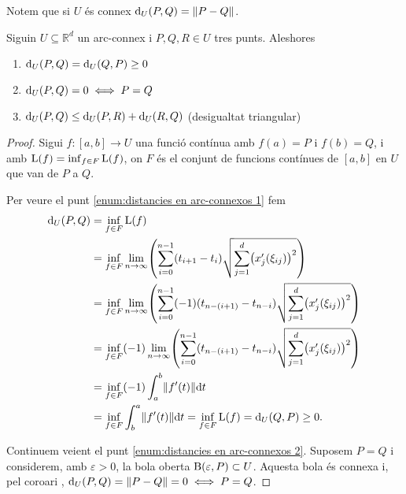 \documentclass[../Apunts.tex]{subfiles}
\begin{document}
	\begin{observation}\label{obs:connex metrica}
		Notem que si \(U\) és connex \(\Dist_{U}(P,Q)=\norm{P-Q}\).
	\end{observation}
	\begin{proposition}
		Siguin \(U\subseteq\mathbb{R}^{d}\) un arc-connex i \(P,Q,R\in U\) tres punts. Aleshores
		\begin{enumerate}
			\item\label{enum:distancies en arc-connexos 1} \(\operatorname{d}_{U}(P,Q)=\operatorname{d}_{U}(Q,P)\geq0\)
			\item\label{enum:distancies en arc-connexos 2} \(\operatorname{d}_{U}(P,Q)=0\iff P=Q\)
			\item\label{enum:distancies en arc-connexos 3} \(\operatorname{d}_{U}(P,Q)\leq \operatorname{d}_{U}(P,R)+\operatorname{d}_{U}(R,Q)\) (desigualtat triangular) %
		\end{enumerate}
		\begin{proof}
			Sigui \(f\colon[a,b]\to U\) una funció contínua amb \(f(a)=P\) i \(f(b)=Q\), i  amb \(\operatorname{L}(f)=\inf_{f\in F}\operatorname{L}(f)\), on \(F\) és el conjunt de funcions contínues de \([a,b]\) en \(U\) que van de \(P\) a \(Q\). %
			
			Per veure el punt \eqref{enum:distancies en arc-connexos 1} fem
			\begin{align*}
			\Dist_{U}(P,Q)&=\inf_{f\in F}\Long(f)\\
			&=\inf_{f\in F}\lim_{n\to\infty}\left(\sum_{i=0}^{n-1}(t_{i+1}-t_{i})\sqrt{\sum_{j=1}^{d}\left(x_{j}'(\xi_{ij})\right)^2}\right)\\
			&=\inf_{f\in F}\lim_{n\to\infty}\left(\sum_{i=0}^{n-1}(-1)(t_{n-(i+1)}-t_{n-i})\sqrt{\sum_{j=1}^{d}\left(x_{j}'(\xi_{ij})\right)^2}\right)\\
			&=\inf_{f\in F}(-1)\lim_{n\to\infty}\left(\sum_{i=0}^{n-1}(t_{n-(i+1)}-t_{n-i})\sqrt{\sum_{j=1}^{d}\left(x_{j}'(\xi_{ij})\right)^2}\right)\\
			&=\inf_{f\in F}(-1)\int_{a}^{b}\norm{f'(t)}\diff t\\
			&=\inf_{f\in F}\int_{b}^{a}\norm{f'(t)}\diff t=\inf_{f\in F}\Long(f)=\Dist_{U}(Q,P)\geq0.
			\end{align*}
			
			Continuem veient el punt \eqref{enum:distancies en arc-connexos 2}. Suposem \(P=Q\) i considerem, amb \(\varepsilon>0\), la bola oberta \(\operatorname{B}(\varepsilon,P)\subset U\). Aquesta bola és connexa i, pel coro{\lgem}ari , \(\Dist_{U}(P,Q)=\norm{P-Q}=0\sii P=Q\).%
			

\end{proof}
\end{proposition}
\end{document}
